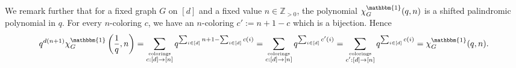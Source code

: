 \documentclass[11pt]{amsart}
\begin{document}
    We remark further that for a fixed graph $G$ on $[d]$ and a fixed value $n \in \mathbb{Z}_{>0}$, the polynomial $\chi_G^\mathbbm{1}(q,n)$ is a
shifted palindromic polynomial in $q$.
    For every $n$-coloring $c$, we have an $n$-coloring $c' := n+1-c$ which is a bijection.
    Hence
    \[
        {q^{d(n+1)} \chi_G^\mathbbm{1}\left(\frac{1}{q},n\right) =\sum_{\substack{\text{\tiny colorings} \\ c:[d] \to [n]}} q^{\sum_{i \in [d]} n+1 -\sum_{i \in [d]} c(i)} = \sum_{\substack{\text{\tiny colorings} \\ c:[d] \to [n]}} q^{\sum_{i \in [d]} c'(i)} =  \sum_{\substack{\text{\tiny colorings} \\ c':[d] \to [n]}} q^{\sum_{i \in [d]} c(i)} =  \chi_G^\mathbbm{1}(q,n)}.
    \]



\end{document}
